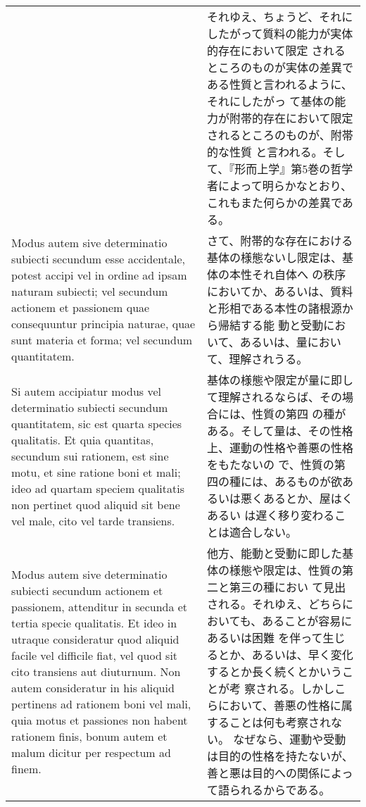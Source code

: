 \documentclass[10pt]{jsarticle} %
\begin{document}
\begin{longtable}{p{21em}p{21em}}
&

それゆえ、ちょうど、それにしたがって質料の能力が実体的存在において限定
されるところのものが実体の差異である性質と言われるように、それにしたがっ
て基体の能力が附帯的存在において限定されるところのものが、附帯的な性質
と言われる。そして、『形而上学』第5巻の哲学者によって明らかなとおり、
これもまた何らかの差異である。


\\



Modus autem sive
determinatio subiecti secundum esse accidentale, potest accipi vel in
ordine ad ipsam naturam subiecti; vel secundum actionem et passionem
quae consequuntur principia naturae, quae sunt materia et forma; vel
secundum quantitatem. 


&

さて、附帯的な存在における基体の様態ないし限定は、基体の本性それ自体へ
の秩序においてか、あるいは、質料と形相である本性の諸根源から帰結する能
動と受動において、あるいは、量において、理解されうる。


\\



Si autem accipiatur modus vel determinatio
subiecti secundum quantitatem, sic est quarta species qualitatis. Et
quia quantitas, secundum sui rationem, est sine motu, et sine ratione
boni et mali; ideo ad quartam speciem qualitatis non pertinet quod
aliquid sit bene vel male, cito vel tarde transiens. 



&


基体の様態や限定が量に即して理解されるならば、その場合には、性質の第四
の種がある。そして量は、その性格上、運動の性格や善悪の性格をもたないの
で、性質の第四の種には、あるものが欲あるいは悪くあるとか、屋はくあるい
は遅く移り変わることは適合しない。


\\


Modus autem sive
determinatio subiecti secundum actionem et passionem, attenditur in
secunda et tertia specie qualitatis. Et ideo in utraque consideratur
quod aliquid facile vel difficile fiat, vel quod sit cito transiens
aut diuturnum. Non autem consideratur in his aliquid pertinens ad
rationem boni vel mali, quia motus et passiones non habent rationem
finis, bonum autem et malum dicitur per respectum ad finem. 


&

他方、能動と受動に即した基体の様態や限定は、性質の第二と第三の種におい
て見出される。それゆえ、どちらにおいても、あることが容易にあるいは困難
を伴って生じるとか、あるいは、早く変化するとか長く続くとかいうことが考
察される。しかしこらにおいて、善悪の性格に属することは何も考察されない。
なぜなら、運動や受動は目的の性格を持たないが、善と悪は目的への関係によっ
て語られるからである。



\end{longtable}
\end{document}

